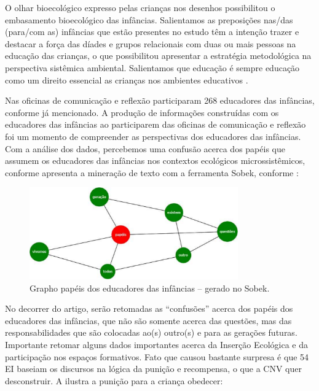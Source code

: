 \documentclass{textolivre-html}
\begin{document}
O olhar bioecológico expresso pelas crianças nos desenhos possibilitou o embasamento bioecológico das infâncias. Salientamos as preposições nas/das (para/com as) infâncias que estão presentes no estudo têm a intenção trazer e destacar a força das díades e grupos relacionais com duas ou mais pessoas na educação das crianças, o que possibilitou apresentar a estratégia metodológica na perspectiva sistêmica ambiental. Salientamos que educação é sempre educação como um direito essencial as crianças nos ambientes educativos \cite{piske2019}. 

Nas oficinas de comunicação e reflexão participaram 268 educadores das infâncias, conforme já mencionado. A produção de informações construídas com os educadores das infâncias ao participarem das oficinas de comunicação e reflexão foi um momento de compreender as perspectivas dos educadores das infâncias. Com a análise dos dados, percebemos uma confusão acerca dos papéis que assumem os educadores das infâncias nos contextos ecológicos microssistêmicos, conforme apresenta a mineração de texto com a ferramenta Sobek, conforme :

\begin{figure}[h!]
 \centering
 \includegraphics[width=0.8\textwidth]{figure07.pdf}
 \caption{Grapho papéis dos educadores das infâncias -- gerado no Sobek.}
 \label{fig-fig07}
\end{figure}


No decorrer do artigo, serão retomadas as “confusões” acerca dos papéis dos educadores das infâncias, que não são somente acerca das questões, mas das responsabilidades que são colocadas ao(s) outro(s) e para as gerações futuras. Importante retomar alguns dados importantes acerca da Inserção Ecológica e da participação nos espaços formativos. Fato que causou bastante surpresa é que 54 EI baseiam os discursos na lógica da punição e recompensa, o que a CNV quer desconstruir. A  ilustra a punição para a criança obedecer: 
\end{document}
